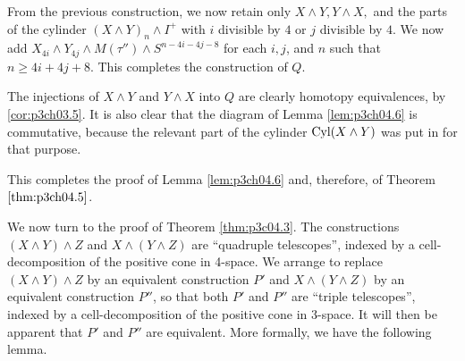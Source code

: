\documentclass[../main]{subfiles}
\begin{document}
From the previous construction, we now retain only $X\wedge Y, Y\wedge X,$ and the parts of the cylinder $(X\wedge Y)_n \wedge I^+$ with $i$ divisible by $4$ or $j$ divisible by $4$. We now add $X_{4i}\wedge Y_{4j} \wedge M(\tau'') \wedge S^{n-4i-4j-8}$ for each $i,j$, and $n$ such that $n\geq 4i+4j+8$. This completes the construction of $Q$.

The injections of $X\wedge Y$ and $Y\wedge X$ into $Q$ are clearly homotopy equivalences, by \ref{cor:p3ch03.5}. It is also clear that the diagram of Lemma \ref{lem:p3ch04.6} is commutative, because the relevant part of the cylinder $\mathrm{Cyl}(X\wedge Y)$ was put in for that purpose.

This completes the proof of Lemma \ref{lem:p3ch04.6} and, therefore, of Theorem $\ref{thm:p3ch04.5}$.


We now turn to the proof of Theorem \ref{thm:p3c04.3}. The constructions $(X \wedge Y) \wedge Z$ and $X \wedge (Y \wedge Z)$ are ``quadruple telescopes'', indexed by a cell-decomposition of the positive cone in 4-space. We arrange to replace $(X \wedge Y) \wedge Z$ by an equivalent construction $P'$ and $X \wedge (Y \wedge Z)$ by an equivalent construction $P''$, so that both $P'$ and $P''$ are ``triple telescopes'', indexed by a cell-decomposition of the positive cone in 3-space. It will then be apparent that $P'$ and $P''$ are equivalent. More formally, we have the following lemma.
\end{document}
